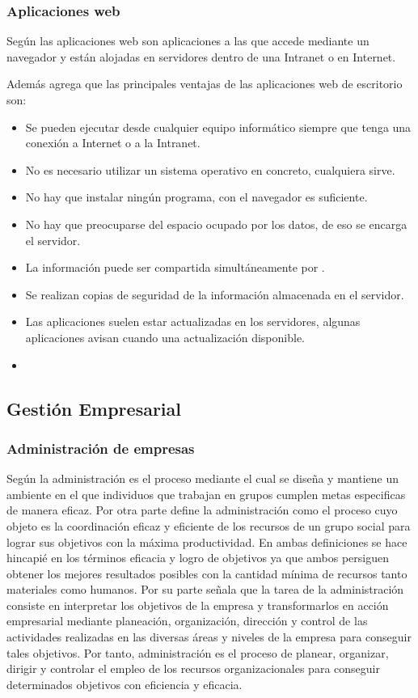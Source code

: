 \subsubsection{Aplicaciones web}
Según \cite{nino} las aplicaciones web son aplicaciones a las que accede mediante un
navegador y están alojadas en servidores dentro de una Intranet o en Internet.

Además \cite{nino} agrega que las principales ventajas de las aplicaciones web de
escritorio son:
\begin{itemize}
    \item Se pueden ejecutar desde cualquier equipo informático siempre que tenga
          una conexión a Internet o a la Intranet.
    \item No es necesario utilizar un sistema operativo en concreto, cualquiera sirve.
    \item No hay que instalar ningún programa, con el navegador es suficiente.
    \item No hay que preocuparse del espacio ocupado por los datos, de eso se encarga
          el servidor.
    \item La información puede ser compartida simultáneamente por .
    \item Se realizan copias de seguridad de la información almacenada en el servidor.
    \item Las aplicaciones suelen estar actualizadas en los servidores, algunas
          aplicaciones avisan cuando una actualización disponible.
    \item
\end{itemize}

\subsection{Gestión Empresarial}
\subsubsection{Administración de empresas}
Según \cite{koontz} la administración es el proceso mediante el cual se diseña
y mantiene un ambiente en el que individuos que trabajan en grupos cumplen metas
especificas de manera eficaz. Por otra parte \citep{galindo} define la administración
como el proceso cuyo objeto es la coordinación eficaz y eficiente de los recursos
de un grupo social para lograr sus objetivos con la máxima productividad.
En ambas definiciones se hace hincapié en los términos eficacia y logro de objetivos
ya que ambos persiguen obtener los mejores resultados posibles con la cantidad
mínima de recursos tanto materiales como humanos. Por su parte \citep{chiavenato}
señala que la tarea de la administración consiste en interpretar los objetivos
de la empresa y transformarlos en acción empresarial mediante planeación, organización,
dirección y control de las actividades realizadas en las diversas áreas y niveles
de la empresa para conseguir tales objetivos. Por tanto, administración es el
proceso de planear, organizar, dirigir y controlar el empleo de los recursos
organizacionales para conseguir determinados objetivos con eficiencia y eficacia.

